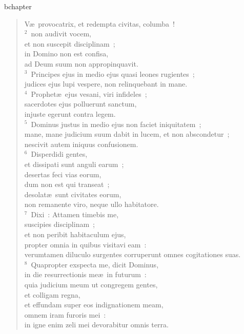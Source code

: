bchapter\begin{verse}\vspace{-19pt}V\ae\ provocatrix, et redempta civitas, columba~!\\
${}^{2}$~non audivit vocem,\\ et non suscepit disciplinam~;\\ in Domino non est confisa,\\ ad Deum suum non appropinquavit.\\
${}^{3}$~Principes ejus in medio ejus quasi leones rugientes~;\\ judices ejus lupi vespere, non relinquebant in mane.\\
${}^{4}$~Prophet\ae\ ejus vesani, viri infideles~;\\ sacerdotes ejus polluerunt sanctum,\\ injuste egerunt contra legem.\\
${}^{5}$~Dominus justus in medio ejus non faciet iniquitatem~;\\ mane, mane judicium suum dabit in lucem, et non abscondetur~;\\ nescivit autem iniquus confusionem.\\
${}^{6}$~Disperdidi gentes,\\ et dissipati sunt anguli earum~;\\ desertas feci vias eorum,\\ dum non est qui transeat~;\\ desolat\ae\ sunt civitates eorum,\\ non remanente viro, neque ullo habitatore.\\
${}^{7}$~Dixi~: Attamen timebis me,\\ suscipies disciplinam~;\\ et non peribit habitaculum ejus,\\ propter omnia in quibus visitavi eam~:\\ verumtamen diluculo surgentes corruperunt omnes cogitationes suas.\\
${}^{8}$~Quapropter exspecta me, dicit Dominus,\\ in die resurrectionis me\ae\ in futurum~:\\ quia judicium meum ut congregem gentes,\\ et colligam regna,\\ et effundam super eos indignationem meam,\\ omnem iram furoris mei~:\\ in igne enim zeli mei devorabitur omnis terra.\end{verse}


